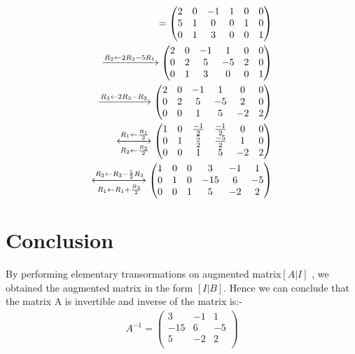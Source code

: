 \documentclass[journal,12pt,twocolumn]{IEEEtran}
\newcommand{\myvec}[1]{\ensuremath{\begin{pmatrix}#1\end{pmatrix}}}
\begin{document}
\begin{align}
 [A | I] = \myvec{
		 2 &0 &-1&  1 & 0 &  0 \\
		   5 &1 &0&  0 &  1 &  0 \\
		 0 &1 &3 &  0 &  0 &  1 \\
		 } \\
\xrightarrow{R_2\leftarrow 2R_2 - 5R_1} \myvec{
		 2 &0 &-1&  1 & 0 &  0 \\
		  0 &2 &5&  -5 &  2 &  0 \\
		 0 &1 &3 &  0 &  0 &  1 \\
		 } 
		 \\
 \xrightarrow{R_3\leftarrow 2R_3 - R_2} \myvec{
		 2 &0 &-1&  1 & 0 &  0 \\
		  0 &2 &5&  -5 &  2 &  0 \\
		 0 &0 &1 &  5 &  -2 &  2 \\
		 } \\
\xleftrightarrow[R_2\leftarrow \frac{R_2}{2}]{R_1\leftarrow \frac{R_1}{2}}\myvec{
		 1 & 0 & \frac{-1}{2} & \frac{-1}{2} & 0 &  0 \\
		  0 & 1 & \frac{5}{2} & \frac{-5}{2} &  1 &  0 \\
		 0 & 0 &1 &  5 &  -2 &  2 \\
		 } 	\\	 
\xleftrightarrow[R_1\leftarrow R_1  + \frac{R_3}{2}]{R_2\leftarrow R_2 - \frac{5}{2}R_3}\myvec{
		 1 & 0 & 0 & 3 & -1 &  1 \\
		  0 & 1 & 0 & -15 &  6 &  -5 \\
		 0 & 0 &1 &  5 &  -2 &  2 \\
		 } 		
\end{align}
\section{Conclusion}
By performing elementary transormations on augmented matrix$ [A | I]$ , we obtained the augmented matrix in the form $ [I|B]$. 
Hence we can conclude that the matrix A is invertible and inverse of the matrix is:-
\begin{align}
A^{-1} = \myvec{
		  3 & -1 &  1 \\
		 -15 &  6 & -5 \\
		  5 &  -2 &  2 \\
		 }
\end{align}
\end{document}
